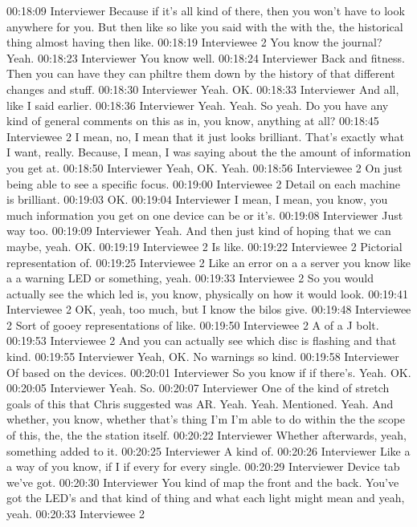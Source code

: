 00:18:09 Interviewer
Because if it's all kind of there, then you won't have to look anywhere for you. But then like so like you said with the with the, the historical thing almost having then like.
00:18:19 Interviewee 2 
You know the journal? Yeah.
00:18:23 Interviewer
You know well.
00:18:24 Interviewer
Back and fitness. Then you can have they can philtre them down by the history of that different changes and stuff.
00:18:30 Interviewer
Yeah. OK.
00:18:33 Interviewer
And all, like I said earlier.
00:18:36 Interviewer
Yeah. Yeah. So yeah. Do you have any kind of general comments on this as in, you know, anything at all?
00:18:45 Interviewee 2 
I mean, no, I mean that it just looks brilliant. That's exactly what I want, really. Because, I mean, I was saying about the the amount of information you get at.
00:18:50 Interviewer
Yeah, OK. Yeah.
00:18:56 Interviewee 2 
On just being able to see a specific focus.
00:19:00 Interviewee 2 
Detail on each machine is brilliant.
00:19:03
OK.
00:19:04 Interviewer
I mean, I mean, you know, you much information you get on one device can be or it's.
00:19:08 Interviewer
Just way too.
00:19:09 Interviewer
Yeah. And then just kind of hoping that we can maybe, yeah. OK.
00:19:19 Interviewee 2 
Is like.
00:19:22 Interviewee 2 
Pictorial representation of.
00:19:25 Interviewee 2 
Like an error on a a server you know like a a warning LED or something, yeah.
00:19:33 Interviewee 2 
So you would actually see the which led is, you know, physically on how it would look.
00:19:41 Interviewee 2 
OK, yeah, too much, but I know the bilos give.
00:19:48 Interviewee 2 
Sort of gooey representations of like.
00:19:50 Interviewee 2 
A of a J bolt.
00:19:53 Interviewee 2 
And you can actually see which disc is flashing and that kind.
00:19:55 Interviewer
Yeah, OK. No warnings so kind.
00:19:58 Interviewer
Of based on the devices.
00:20:01 Interviewer
So you know if if there's. Yeah. OK.
00:20:05 Interviewer
Yeah. So.
00:20:07 Interviewer
One of the kind of stretch goals of this that Chris suggested was AR. Yeah. Yeah. Mentioned. Yeah. And whether, you know, whether that's thing I'm I'm able to do within the the scope of this, the, the the station itself.
00:20:22 Interviewer
Whether afterwards, yeah, something added to it.
00:20:25 Interviewer
A kind of.
00:20:26 Interviewer
Like a a way of you know, if I if every for every single.
00:20:29 Interviewer
Device tab we've got.
00:20:30 Interviewer
You kind of map the front and the back. You've got the LED's and that kind of thing and what each light might mean and yeah, yeah.
00:20:33 Interviewee 2 

